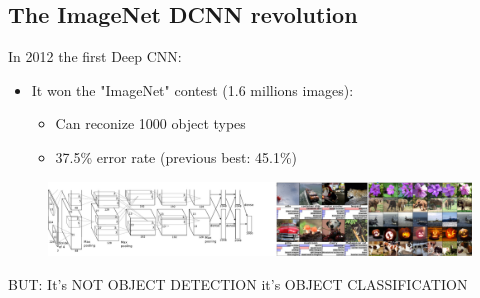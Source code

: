 \documentclass{beamer}[10pt, usepdftitle=false, handout]
\begin{document}
    \subsection{The ImageNet DCNN revolution}    
    \begin{frame}

	In 2012 the first Deep CNN:
	\vspace*{1em}
	
	\begin{itemize}
	\item{It won the "ImageNet" contest (1.6 millions images):
		\begin{itemize}
			\item{Can reconize 1000 object types}
			\item{37.5\% error rate (previous best: 45.1\%)}
		\end{itemize}
	}
	
	\end{itemize}
	
	\begin{figure}
		\includegraphics[scale=0.45]{31.png} 
	\end{figure}
	

	\vspace*{1em}
	
	\begin{block}{BUT:}
	It's NOT OBJECT DETECTION it's OBJECT CLASSIFICATION
	\end{block}
	 	
	\end{frame} 
	    
\end{document}

